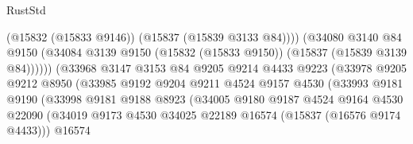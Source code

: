 \begin{lexlean}{RustStd}
\begin{coremodule}
                                          (@15832 (@15833 @9146))
                                          (@15837 (@15839 @3133 @84))))
                                      (@34080
                                        @3140
                                        @84
                                        @9150
                                        (@34084
                                          @3139
                                          @9150
                                          (@15832 (@15833 @9150))
                                          (@15837 (@15839 @3139 @84))))))
                                  (@33968
                                    @3147
                                    @3153
                                    @84
                                    @9205
                                    @9214
                                    @4433
                                    @9223
                                    (@33978
                                      @9205
                                      @9212
                                      @8950
                                      (@33985
                                        @9192
                                        @9204
                                        @9211
                                        @4524
                                        @9157
                                        @4530
                                        (@33993
                                          @9181
                                          @9190
                                          (@33998
                                            @9181
                                            @9188
                                            @8923
                                            (@34005
                                              @9180
                                              @9187
                                              @4524
                                              @9164
                                              @4530
                                              @22090
                                              (@34019
                                                @9173
                                                @4530
                                                @34025
                                                @22189
                                                @16574
                                                (@15837 (@16576 @9174 @4433)))
                                              @16574

\end{coremodule}
\end{lexlean}

